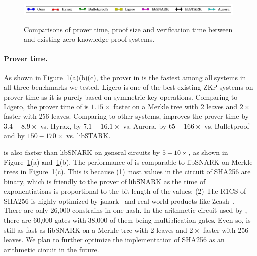 \begin{figure}[htbp]
{	%
}%
%
\quad
\centering
\includegraphics[width = 6.5in]{legend.pdf}
\caption{\label{fig:Allcom}Comparisons of prover time, proof size and verification time between \name{} and existing zero knowledge proof systems.}
\end{figure}


\paragraph{Prover time.} As shown in Figure~\ref{fig:Allcom}(a)(b)(c), the prover in \name is the fastest among all systems in all three benchmarks we tested. Ligero is one of the best existing ZKP systems on prover time as it is purely based on symmetric key operations. Comparing to Ligero, the prover time of \name is $1.15\times$ faster on a Merkle tree with 2 leaves and $2\times$ faster with 256 leaves. Comparing to other systems, \name improves the prover time by $3.4-8.9\times$ vs. Hyrax, by $7.1-16.1\times$ vs. Aurora, by $65-166\times$ vs. Bulletproof and by $150-170\times$ vs. libSTARK. 

\name is also faster than libSNARK on general circuits by $5-10\times$, as shown in Figure~\ref{fig:Allcom}(a) and~\ref{fig:Allcom}(b). The performance of \name is comparable to libSNARK on Merkle trees in Figure~\ref{fig:Allcom}(c). This is because (1) most values in the circuit of SHA256 are binary, which is friendly to the prover of libSNARK as the time of exponentiations is proportional to the bit-length of the values; (2) The R1CS of SHA256 is highly optimized by jsnark~\cite{jsnark} and real world products like Zcash~\cite{zerocash}. There are only 26,000 constrains in one hash. In the arithmetic circuit used by \name, there are 60,000 gates with 38,000 of them being multiplication gates. Even so, \name is still as fast as libSNARK on a Merkle tree with 2 leaves and $2\times$ faster with 256 leaves. We plan to further optimize the implementation of SHA256 as an arithmetic circuit in the future.

